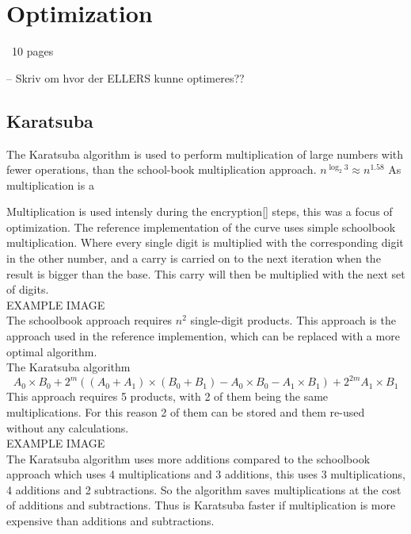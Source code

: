 \section{Optimization}
~10 pages


-- Skriv om hvor der ELLERS kunne optimeres??


\subsection{Karatsuba}
The Karatsuba algorithm is used to perform multiplication of large numbers with fewer operations, than the school-book multiplication approach.
$n^{\log_{2}3} \approx n^{1.58}$
As multiplication is a 

Multiplication is used intensly during the encryption[] steps, this was a focus of optimization. The reference implementation of the curve uses simple schoolbook multiplication.
Where every single digit is multiplied with the corresponding digit in the other number, and a carry is carried on to the next iteration when the result is bigger than the base. This carry will then be multiplied with the next set of digits.\\
EXAMPLE IMAGE\\
The schoolbook approach requires $n^{2}$ single-digit products. 
This approach is the approach used in the reference implemention, which can be replaced with a more optimal algorithm.
\\

The Karatsuba algorithm 
\[A_0 \times B_0 + 2^{m}((A_0 + A_1) \times (B_0 + B_1) - A_0 \times B_0 - A_1 \times B_1) + 2^{2m} A_1 \times B_1\]
This approach requires 5 products, with 2 of them being the same multiplications. For this reason 2 of them can be stored and them re-used without any calculations.
\\EXAMPLE IMAGE\\
The Karatsuba algorithm uses more additions compared to the schoolbook approach which uses 4 multiplications and 3 additions, this uses 3 multiplications, 4 additions and 2 subtractions. So the algorithm saves multiplications at the cost of additions and subtractions. Thus is Karatsuba faster if multiplication is more expensive than additions and subtractions. 

